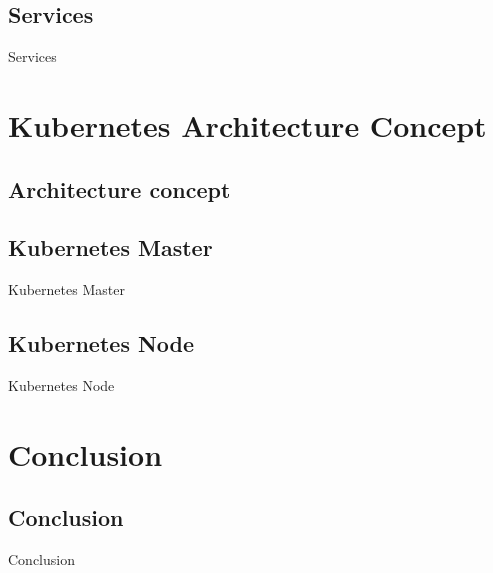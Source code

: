 \documentclass{bredelebeamer}
\begin{document}
\subsection{Services}
\begin{frame}{Services}




\end{frame}

\section{Kubernetes Architecture Concept}
\subsection{Architecture concept}

\subsection{Kubernetes Master}
\begin{frame}{Kubernetes Master}
\end{frame}

\subsection{Kubernetes Node}
\begin{frame}{Kubernetes Node}
\end{frame}

\section{Conclusion}
\subsection{Conclusion}
\begin{frame}{Conclusion}

\end{frame}
\end{document}
